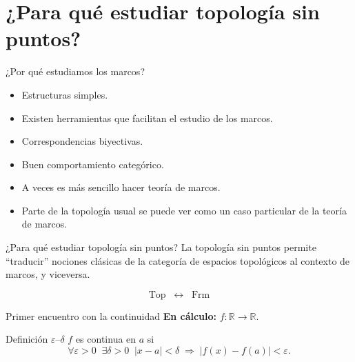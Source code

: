 \documentclass[compress,12pt]{beamer}
\DeclareMathOperator{\Frm}{Frm}
\DeclareMathOperator{\Top}{Top}
\begin{document}
\section{¿Para qué estudiar topología sin puntos?}
\begin{frame}{¿Por qué estudiamos los marcos?}
    \begin{itemize}
        \item Estructuras simples.
        \item<2-> Existen herramientas que facilitan el estudio de los marcos.
        \item<3-> Correspondencias biyectivas.
        \item<4-> Buen comportamiento categórico.
        \item<5-> A veces es más sencillo hacer teoría de marcos.
        \item<6-> Parte de la topología usual se puede ver como un caso particular de la teoría de marcos.
    \end{itemize}        
\end{frame}

\begin{frame}{¿Para qué estudiar topología sin puntos?}
La topología sin puntos permite ``traducir'' nociones clásicas de la categoría de espacios topológicos al contexto de marcos, y viceversa.

  \[
    \Top \;\longleftrightarrow\; \Frm
  \]

  \vspace{1em}


  \vspace{0.5em}

\end{frame}

\begin{frame}{Primer encuentro con la continuidad}
  \textbf{En cálculo:} $f:\mathbb{R}\to\mathbb{R}$.

  \begin{block}{Definición $\varepsilon$–$\delta$}
    $f$ es continua en $a$ si
    \[
      \forall \varepsilon>0 \;\; \exists \delta>0 \;\; 
      |x-a|<\delta \;\Rightarrow\; |f(x)-f(a)|<\varepsilon.
    \]
  \end{block}

\end{frame}
\end{document}
